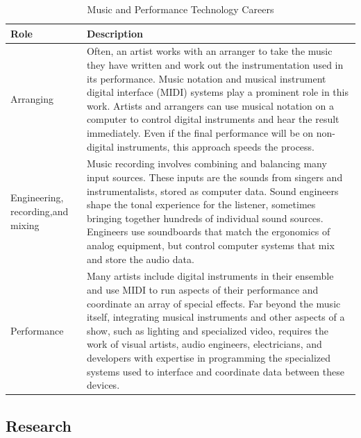\begin{table}[H]
	\begin{center}
		\caption{Music and Performance Technology Careers}
		\vskip 4pt
		\begin{tabular}{p{1in}|p{3.4in}} 
			\textbf{Role} & \textbf{Description}\\
			\hline
			Arranging & Often, an artist works with an arranger to take the music they have written and work out the instrumentation used in its performance. Music notation and musical instrument digital interface (MIDI) systems play a prominent role in this work. Artists and arrangers can use musical notation on a computer to control digital instruments and hear the result immediately. Even if the final performance will be on non-digital instruments, this approach speeds the process.\\
			\hline
			Engineering, recording,\linebreak and mixing & Music recording involves combining and balancing many input sources. These inputs are the sounds from singers and instrumentalists, stored as computer data. Sound engineers shape the tonal experience for the listener, sometimes bringing together hundreds of individual sound sources. Engineers use soundboards that match the ergonomics of analog equipment, but control computer systems that mix and store the audio data.\\
			\hline
			Performance & Many artists include digital instruments in their ensemble and use MIDI to run aspects of their performance and coordinate an array of special effects. Far beyond the music itself, integrating musical instruments and other aspects of a show, such as lighting and specialized video, requires the work of visual artists, audio engineers, electricians, and developers with expertise in programming the specialized systems used to interface and coordinate data between these devices.\\
			\hline
		\end{tabular}
	\end{center}
\end{table}

\subsection{Research}


